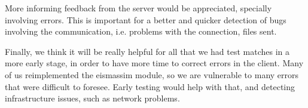 \documentclass{llncs2e/llncs}
\begin{document}
    More informing feedback from the server would be appreciated, specially
    involving errors. This is important for a better and quicker detection of bugs
    involving the communication, i.e. problems with the connection, files sent.

    Finally, we think it will be really helpful for all that we had test matches 
    in a more early stage, in order to have more time to correct errors in the 
    client. Many of us reimplemented the eismassim module, so we are vulnerable to 
    many errors that were difficult to foresee. Early testing would help with 
    that, and detecting infrastructure issues, such as network problems.
    
    

    
 
 

%
\end{document}
